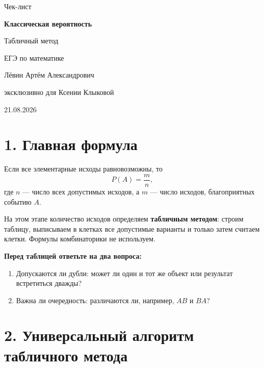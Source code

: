 \documentclass[a4paper,12pt]{article}
\newcommand{\key}[1]{\textbf{\textcolor{darkaccent}{#1}}}
\begin{document}
\color{textgray}

\begin{titlepage}
\thispagestyle{empty}
\centering
\vspace*{2.1cm}
{\Large\textcolor{darkaccent}{Чек-лист}\par}
\vspace{0.75cm}
{\Huge\bfseries Классическая вероятность\par}
\vspace{0.35cm}
{\LARGE Табличный метод\par}
\vspace{1.1cm}
{\large ЕГЭ по математике\par}
\vfill
{\large Лёвин Артём Александрович\par}
\vspace{0.2cm}
{\large эксклюзивно для Ксении Клыковой\par}
\vspace{0.7cm}
{\normalsize 21.08.2026\par}
\vfill
{}
\vspace*{0.7cm}
\end{titlepage}

\section*{1. Главная формула}

Если все элементарные исходы равновозможны, то
\[
P(A)=\frac{m}{n},
\]
где $n$ --- число всех допустимых исходов, а $m$ --- число исходов,
благоприятных событию $A$.

На этом этапе количество исходов определяем \key{табличным методом}:
строим таблицу, выписываем в клетках все допустимые варианты и только затем
считаем клетки. Формулы комбинаторики не используем.

\key{Перед таблицей ответьте на два вопроса:}
\begin{enumerate}
\item Допускаются ли дубли: может ли один и тот же объект или результат встретиться дважды?
\item Важна ли очередность: различаются ли, например, $AB$ и $BA$?
\end{enumerate}

\section*{2. Универсальный алгоритм табличного метода}
\end{document}
